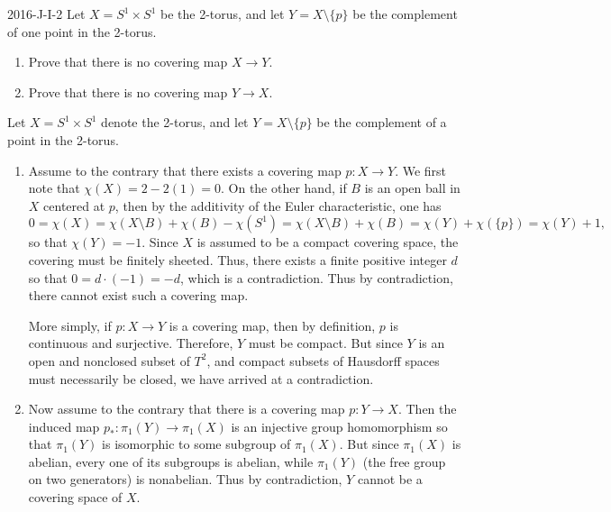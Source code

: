 \documentclass{article}
\begin{document}
	\begin{prb}{2016-J-I-2}
		Let $X = S^{1} \times S^{1}$ be the 2-torus, and let $Y = X \setminus \{p\}$ be the complement of one point in the 2-torus. \vspace{-0.25cm}
		\begin{enumerate}[itemsep =-2pt,label = (\alph{*})]
			\item Prove that there is no covering map $X \to Y$. 
			\item Prove that there is no covering map $Y \to X$. 
		\end{enumerate}
	\end{prb}
	Let $X = S^{1}\times S^{1}$ denote the 2-torus, and let $Y = X \setminus \{p\}$ be the complement of a point in the 2-torus. \vspace{-0.25cm}
	\begin{enumerate}[itemsep =-2pt,label = (\alph{*})]
		\item Assume to the contrary that there exists a covering map $p: X \to Y$. We first note that $\chi(X) = 2 - 2(1) = 0$. On the other hand, if $B$ is an open ball in $X$ centered at $p$, then by the additivity of the Euler characteristic, one has 
		\begin{equation*}
			0 = \chi(X) = \chi(X \setminus B) + \chi(B) - \chi(S^{1}) = \chi(X \setminus B) + \chi(B) = \chi(Y) + \chi(\{p\}) = \chi(Y) + 1, 
		\end{equation*}
		so that $\chi(Y) = -1$. Since $X$ is assumed to be a compact covering space, the covering must be finitely sheeted. Thus, there exists a finite positive integer $d$ so  that $0 = d \cdot (-1) = -d$, which is a contradiction. Thus by contradiction, there cannot exist such a covering map. 
		
		More simply, if $p: X \to Y$ is a covering map, then by definition, $p$ is continuous and surjective. Therefore, $Y$ must be compact. But since $Y$ is an open and nonclosed subset of $T^2$, and compact subsets of Hausdorff spaces must necessarily be closed, we have arrived at a contradiction. 
		
		\item Now assume to the contrary that there is a covering map $p: Y \to X$. Then the induced map $p_{\ast}: \pi_{1}(Y) \to \pi_{1}(X)$ is an injective group homomorphism so that $\pi_{1}(Y)$ is isomorphic to some subgroup of $\pi_{1}(X)$. But since $\pi_{1}(X)$ is abelian, every one of its subgroups is abelian, while $\pi_{1}(Y)$ (the free group on two generators) is nonabelian. Thus by contradiction, $Y$ cannot be a covering space of $X$. 
	\end{enumerate}
	
\end{document}
